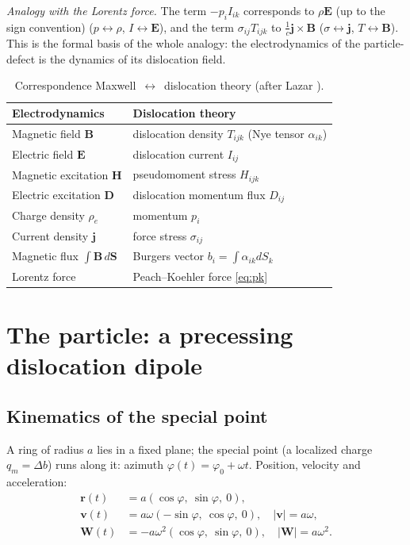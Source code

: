 \documentclass[12pt,a4paper]{article}
\begin{document}
\textit{Analogy with the Lorentz force.} The term $-p_iI_{ik}$ corresponds to
$\rho\mathbf E$ (up to the sign convention) ($p\leftrightarrow\rho$, $I\leftrightarrow\mathbf E$), and the term
$\sigma_{ij}T_{ijk}$ to $\frac1c\mathbf j\times\mathbf B$ ($\sigma\leftrightarrow\mathbf j$,
$T\leftrightarrow\mathbf B$). This is the formal basis of the whole analogy: the
electrodynamics of the particle-defect is the dynamics of its dislocation field.

\begin{table}[h]
\centering
\caption{Correspondence Maxwell~$\leftrightarrow$~dislocation theory (after Lazar \cite{lazar2010,lazar2010pla}).}
\label{tab:corr}
\begin{tabular}{ll}
\toprule
Electrodynamics & Dislocation theory \\
\midrule
Magnetic field $\mathbf{B}$ & dislocation density $T_{ijk}$ (Nye tensor $\alpha_{ik}$) \\
Electric field $\mathbf{E}$ & dislocation current $I_{ij}$ \\
Magnetic excitation $\mathbf{H}$ & pseudomoment stress $H_{ijk}$ \\
Electric excitation $\mathbf{D}$ & dislocation momentum flux $D_{ij}$ \\
Charge density $\rho_e$ & momentum $p_i$ \\
Current density $\mathbf j$ & force stress $\sigma_{ij}$ \\
Magnetic flux $\int\mathbf{B}\,d\mathbf{S}$ & Burgers vector $b_i=\int\alpha_{ik}dS_k$ \\
Lorentz force & Peach--Koehler force \eqref{eq:pk} \\
\bottomrule
\end{tabular}
\end{table}

\section{The particle: a precessing dislocation dipole}

\subsection{Kinematics of the special point}
A ring of radius $a$ lies in a fixed plane; the special point (a localized
charge $q_m=\Delta b$) runs along it: azimuth $\varphi(t)=\varphi_0+\omega t$.
Position, velocity and acceleration:
\begin{align}
\mathbf{r}(t) &= a(\cos\varphi,\ \sin\varphi,\ 0),\\
\mathbf{v}(t) &= a\omega(-\sin\varphi,\ \cos\varphi,\ 0),\quad |\mathbf{v}|=a\omega,\\
\mathbf{W}(t) &= -a\omega^2(\cos\varphi,\ \sin\varphi,\ 0),\quad |\mathbf{W}|=a\omega^2.
\label{eq:accel}
\end{align}
\end{document}
